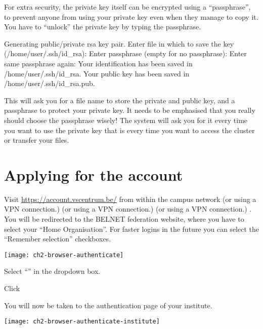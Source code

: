   For extra security, the private key itself can be encrypted using a ``passphrase'',
  to prevent anyone from using your private key even when they manage to copy
  it. You have to ``unlock'' the private key by typing the passphrase.

\begin{prompt}
Generating public/private rsa key pair.
Enter file in which to save the key (/home/user/.ssh/id_rsa):
Enter passphrase (empty for no passphrase):
Enter same passphrase again:
Your identification has been saved in /home/user/.ssh/id_rsa.
Your public key has been saved in /home/user/.ssh/id_rsa.pub.
\end{prompt}

  This will ask you for a file name to store the private and public key, and a
  passphrase to protect your private key. It needs to be emphasised that you
  really should choose the passphrase wisely! The system will ask you for it
  every time you want to use the private key that is every time you want to
  access the cluster or transfer your files.

\fi %

\section{Applying for the account}
\label{sec:applying-for-the-account}

Visit \url{https://account.vscentrum.be/} from within the \university campus
network 
\ifantwerpen
(or using a VPN connection.)
\fi
\ifbrussel
(or using a VPN connection.)
\fi
\ifgent
(or using a VPN connection.)
\fi
\ifleuven
.
\fi
You will be redirected to the BELNET federation website,
where you have to select your ``Home Organisation''.
For faster logins in the future you can select the ``Remember selection'' checkboxes.

\begin{center}
\texttt{[image: ch2-browser-authenticate]}
\end{center}

Select ``\university'' in the dropdown box.

Click 

You will now be taken to the authentication page of your institute.

\ifantwerpen
\begin{center}
\texttt{[image: ch2-browser-authenticate-institute]}
\end{center}

